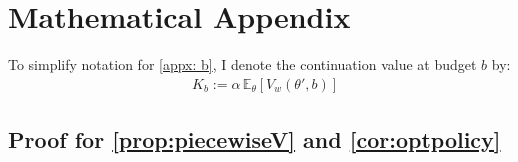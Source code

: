\section{Mathematical Appendix}\label{appx: b} 
To simplify notation for \autoref{appx: b}, I denote the continuation value at budget $b$ by: 
\begin{equation*}
    \begin{aligned}
        &K_{b}:=\alpha \,\mathbb{E}_{\theta}\left[V_w(\theta', b)\right] 
    \end{aligned} 
\end{equation*}

\subsection{Proof for \autoref{prop:piecewiseV} and \autoref{cor:optpolicy}} 
